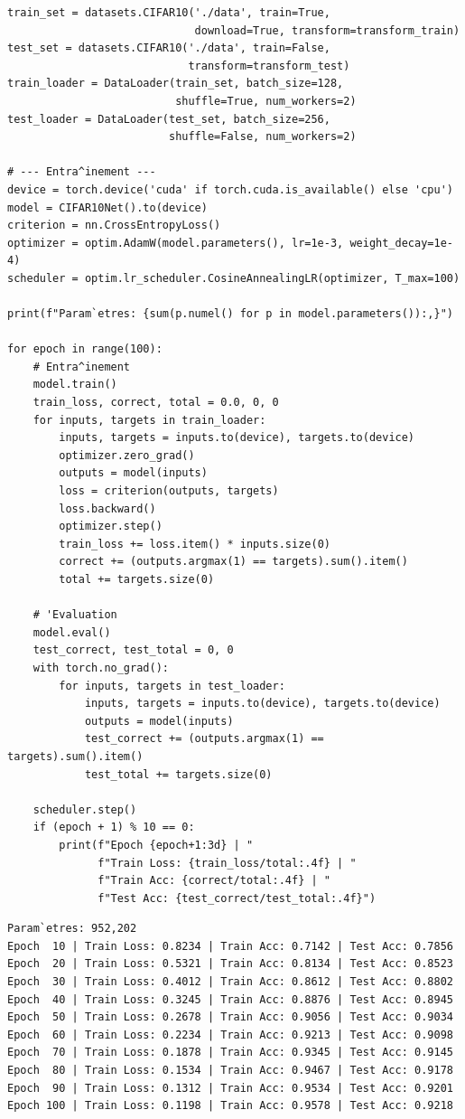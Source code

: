 \begin{codeblock}[title=\textbf{CNN pour CIFAR-10 avec entra\^inement complet}]
\begin{verbatim}
train_set = datasets.CIFAR10('./data', train=True,
                             download=True, transform=transform_train)
test_set = datasets.CIFAR10('./data', train=False,
                            transform=transform_test)
train_loader = DataLoader(train_set, batch_size=128,
                          shuffle=True, num_workers=2)
test_loader = DataLoader(test_set, batch_size=256,
                         shuffle=False, num_workers=2)

# --- Entra^inement ---
device = torch.device('cuda' if torch.cuda.is_available() else 'cpu')
model = CIFAR10Net().to(device)
criterion = nn.CrossEntropyLoss()
optimizer = optim.AdamW(model.parameters(), lr=1e-3, weight_decay=1e-4)
scheduler = optim.lr_scheduler.CosineAnnealingLR(optimizer, T_max=100)

print(f"Param`etres: {sum(p.numel() for p in model.parameters()):,}")

for epoch in range(100):
    # Entra^inement
    model.train()
    train_loss, correct, total = 0.0, 0, 0
    for inputs, targets in train_loader:
        inputs, targets = inputs.to(device), targets.to(device)
        optimizer.zero_grad()
        outputs = model(inputs)
        loss = criterion(outputs, targets)
        loss.backward()
        optimizer.step()
        train_loss += loss.item() * inputs.size(0)
        correct += (outputs.argmax(1) == targets).sum().item()
        total += targets.size(0)

    # 'Evaluation
    model.eval()
    test_correct, test_total = 0, 0
    with torch.no_grad():
        for inputs, targets in test_loader:
            inputs, targets = inputs.to(device), targets.to(device)
            outputs = model(inputs)
            test_correct += (outputs.argmax(1) == targets).sum().item()
            test_total += targets.size(0)

    scheduler.step()
    if (epoch + 1) % 10 == 0:
        print(f"Epoch {epoch+1:3d} | "
              f"Train Loss: {train_loss/total:.4f} | "
              f"Train Acc: {correct/total:.4f} | "
              f"Test Acc: {test_correct/test_total:.4f}")
\end{verbatim}
\end{codeblock}

\begin{codeoutput}
\begin{verbatim}
Param`etres: 952,202
Epoch  10 | Train Loss: 0.8234 | Train Acc: 0.7142 | Test Acc: 0.7856
Epoch  20 | Train Loss: 0.5321 | Train Acc: 0.8134 | Test Acc: 0.8523
Epoch  30 | Train Loss: 0.4012 | Train Acc: 0.8612 | Test Acc: 0.8802
Epoch  40 | Train Loss: 0.3245 | Train Acc: 0.8876 | Test Acc: 0.8945
Epoch  50 | Train Loss: 0.2678 | Train Acc: 0.9056 | Test Acc: 0.9034
Epoch  60 | Train Loss: 0.2234 | Train Acc: 0.9213 | Test Acc: 0.9098
Epoch  70 | Train Loss: 0.1878 | Train Acc: 0.9345 | Test Acc: 0.9145
Epoch  80 | Train Loss: 0.1534 | Train Acc: 0.9467 | Test Acc: 0.9178
Epoch  90 | Train Loss: 0.1312 | Train Acc: 0.9534 | Test Acc: 0.9201
Epoch 100 | Train Loss: 0.1198 | Train Acc: 0.9578 | Test Acc: 0.9218
\end{verbatim}
\end{codeoutput}


